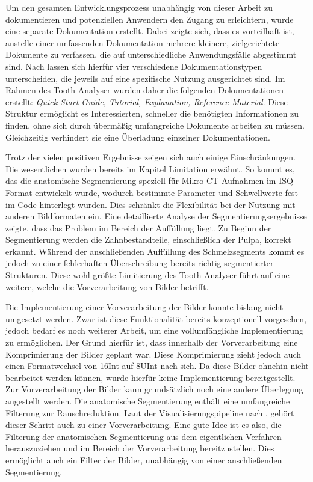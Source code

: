 Um den gesamten Entwicklungsprozess unabhängig von dieser Arbeit zu
dokumentieren und potenziellen Anwendern den Zugang zu erleichtern, wurde eine separate
Dokumentation erstellt. Dabei zeigte sich, dass es vorteilhaft ist, anstelle
einer umfassenden Dokumentation mehrere kleinere, zielgerichtete Dokumente zu verfassen,
die auf unterschiedliche Anwendungsfälle abgestimmt sind. Nach \citet{procida2017}
lassen sich hierfür vier verschiedene Dokumentationstypen unterscheiden, die jeweils
auf eine spezifische Nutzung ausgerichtet sind. Im Rahmen des Tooth Analyser
wurden daher die folgenden Dokumentationen erstellt: \textit{Quick Start Guide, Tutorial,
Explanation, Reference Material}. Diese Struktur ermöglicht es Interessierten,
schneller die benötigten Informationen zu finden, ohne sich durch übermäßig umfangreiche
Dokumente arbeiten zu müssen. Gleichzeitig verhindert sie eine Überladung
einzelner Dokumentationen.

Trotz der vielen positiven Ergebnisse zeigen sich auch einige Einschränkungen. Die
wesentlichen wurden bereits im Kapitel Limitation erwähnt. So kommt es, das die anatomische
Segmentierung speziell für Mikro-\ac{CT}-Aufnahmen im \ac{ISQ}-Format entwickelt
wurde, wodurch bestimmte Parameter und Schwellwerte fest im Code hinterlegt
wurden. Dies schränkt die Flexibilität bei der Nutzung mit anderen Bildformaten ein.
Eine detaillierte Analyse der Segmentierungsergebnisse zeigte, dass das Problem im
Bereich der Auffüllung liegt. Zu Beginn der Segmentierung werden die
Zahnbestandteile, einschließlich der Pulpa, korrekt erkannt. Während der anschließenden
Auffüllung des Schmelzsegments kommt es jedoch zu einer fehlerhaften Überschreibung
bereits richtig segmentierter Strukturen. Diese wohl größte Limitierung des
Tooth Analyser führt auf eine weitere, welche die Vorverarbeitung von Bilder betrifft.

Die Implementierung einer Vorverarbeitung der Bilder konnte bislang nicht umgesetzt
werden. Zwar ist diese Funktionalität bereits konzeptionell vorgesehen, jedoch bedarf
es noch weiterer Arbeit, um eine vollumfängliche Implementierung zu ermöglichen.
Der Grund hierfür ist, dass innerhalb der Vorverarbeitung eine Komprimierung der
Bilder geplant war. Diese Komprimierung zieht jedoch auch einen Formatwechsel von
\ac{16Int} auf \ac{8UInt} nach sich. Da diese Bilder ohnehin nicht bearbeitet
werden können, wurde hierfür keine Implementierung bereitgestellt. Zur
Vorverarbeitung der Bilder kann grundsätzlich noch eine andere Überlegung
angestellt werden. Die anatomische Segmentierung enthält eine umfangreiche Filterung
zur Rauschreduktion. Laut der Visualisierungspipeline nach \citet[S.~50]{handels2000},
gehört dieser Schritt auch zu einer Vorverarbeitung. Eine gute Idee ist es also,
die Filterung der anatomischen Segmentierung aus dem eigentlichen Verfahren
herauszuziehen und im Bereich der Vorverarbeitung bereitzustellen. Dies ermöglicht
auch ein Filter der Bilder, unabhängig von einer anschließenden Segmentierung.

